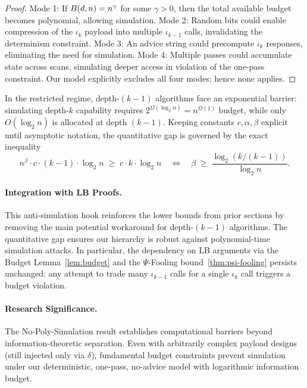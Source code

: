 \begin{proof}
Mode 1: If $\B(d,n) = n^\gamma$ for some $\gamma>0$, then the total available budget becomes polynomial, allowing simulation.
Mode 2: Random bits could enable compression of the $\iota_k$ payload into multiple $\iota_{k-1}$ calls, invalidating the determinism constraint.
Mode 3: An advice string could precompute $\iota_k$ responses, eliminating the need for simulation.
Mode 4: Multiple passes could accumulate state across scans, simulating deeper access in violation of the one-pass constraint.
Our model explicitly excludes all four modes; hence none applies.
\end{proof}

\begin{corollary}
\label{AntiSim:cor:barrier}
In the restricted regime, depth-\((k{-}1)\) algorithms face an exponential barrier: simulating depth-$k$ capability requires $2^{\Omega(\log_{2} n)} = n^{\Omega(1)}$ budget, while only $O(\log_{2} n)$ is allocated at depth $(k{-}1)$. Keeping constants $c,\alpha,\beta$ explicit until asymptotic notation, the quantitative gap is governed by the exact inequality
\[
n^{\beta} \cdot c \cdot (k{-}1) \cdot \log_{2} n
\;\ge\; c \cdot k \cdot \log_{2} n
\quad \Longleftrightarrow \quad
\beta \;\geq\; \frac{\log_{2}(k/(k{-}1))}{\log_{2} n}.
\]
\end{corollary}

\paragraph{Integration with LB Proofs.}
This anti-simulation hook reinforces the lower bounds from prior sections by removing the main potential workaround for depth-\((k{-}1)\) algorithms. The quantitative gap ensures our hierarchy is robust against polynomial-time simulation attacks. In particular, the dependency on LB arguments via the Budget Lemma~\ref{lem:budget} and the $\Psi$-Fooling bound~\ref{thm:psi-fooling} persists unchanged: any attempt to trade many $\iota_{k-1}$ calls for a single $\iota_k$ call triggers a budget violation.

\paragraph{Research Significance.}
The No-Poly-Simulation result establishes computational barriers beyond information-theoretic separation. Even with arbitrarily complex payload designs (still injected only via $\delta$), fundamental budget constraints prevent simulation under our deterministic, one-pass, no-advice model with logarithmic information budget.

